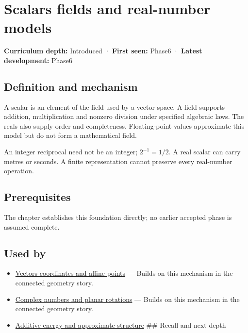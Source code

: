\hypertarget{appendix-52051ad550fe}{}\label{referencestart:appendix-52051ad550fe}
\section{Scalars fields and real-number models}\label{appendix-52051ad550fe-scalars-fields-and-real-number-models}

\textbf{Curriculum depth:} Introduced · \textbf{First seen:} Phase6 · \textbf{Latest development:} Phase6

\subsection{Definition and mechanism}\label{appendix-52051ad550fe-definition-and-mechanism}

A scalar is an element of the field used by a vector space. A field supports addition, multiplication and nonzero division under specified algebraic laws. The reals also supply order and completeness. Floating-point values approximate this model but do not form a mathematical field.

An integer reciprocal need not be an integer; \(2^{-1}=1/2\). A real scalar can carry metres or seconds. A finite representation cannot preserve every real-number operation.

\subsection{Prerequisites}\label{appendix-52051ad550fe-prerequisites}

The chapter establishes this foundation directly; no earlier accepted phase is assumed complete.

\subsection{Used by}\label{appendix-52051ad550fe-used-by}

\begin{itemize}
\item
  \hyperref[appendix-0659864c0aa3]{Vectors coordinates and affine points} --- Builds on this mechanism in the connected geometry story.
\item
  \hyperref[appendix-f77eadcc4a93]{Complex numbers and planar rotations} --- Builds on this mechanism in the connected geometry story.
\item
  \hyperref[appendix-b0732b22e7d6]{Additive energy and approximate structure} \#\# Recall and next depth
\end{itemize}

